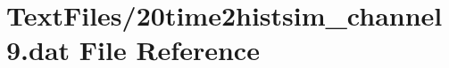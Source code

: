 \hypertarget{20time2histsim__channel9_8dat}{}\section{Text\+Files/20time2histsim\+\_\+channel9.dat File Reference}
\label{20time2histsim__channel9_8dat}
